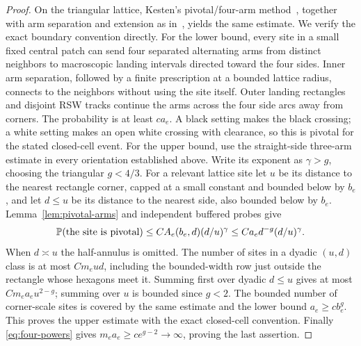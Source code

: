 \begin{proof}
On the triangular lattice, Kesten's pivotal/four-arm
method~\cite[Section~4]{kesten87}, together with arm separation and
extension as in~\cite{nolin08}, yields the same estimate.
We verify the exact boundary convention directly.  For
the lower bound, every site in a small fixed central patch can
send four separated alternating arms from distinct neighbors to
macroscopic landing intervals directed toward the four sides.
Inner arm separation, followed by a finite prescription at a
bounded lattice radius, connects to the neighbors without using
the site itself.  Outer landing rectangles and disjoint RSW tracks
continue the arms across the four side arcs away from corners.
The probability is at least $c a_e$.  A black setting makes the
black crossing; a white setting makes an open white crossing with
clearance, so this is pivotal for the stated closed-cell event.
For the upper bound, use the straight-side three-arm estimate in
every orientation established above.  Write its exponent as
$\gamma>g$, choosing the triangular $g<4/3$.  For a relevant lattice site let $u$ be
its distance to the nearest rectangle corner, capped at a small
constant and bounded below by $b_e$, and let $d\le u$ be its
distance to the nearest side, also bounded below by $b_e$.
Lemma~\ref{lem:pivotal-arms} and independent buffered probes give
\[
 \mathbb P(\text{the site is pivotal})
 \le C A_e(b_e,d)(d/u)^\gamma
 \le C a_e d^{-g}(d/u)^\gamma.
\]
When $d\asymp u$ the half-annulus is omitted.  The number of sites
in a dyadic $(u,d)$ class is at most $C m_eud$, including the
bounded-width row just outside the rectangle whose hexagons
meet it.  Summing first over dyadic $d\le u$ gives at most
$C m_ea_eu^{2-g}$; summing over $u$ is bounded since $g<2$.
The bounded number of corner-scale sites is covered by the
same estimate and the lower bound $a_e\ge c b_e^g$.
This proves the upper estimate with the exact closed-cell convention.
Finally \eqref{eq:four-powers} gives
$m_ea_e\ge c e^{g-2}\to\infty$, proving the last assertion.
\end{proof}
